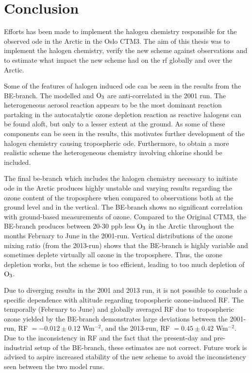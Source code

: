 \setcounter{chapter}{7}
\chapter{Conclusion}\label{Chap:conclusion}

Efforts has been made to implement the halogen chemistry responsible for the observed \acrfull{ode} in the Arctic in the Oslo CTM3. The aim of this thesis was to implement the halogen chemistry, verify the new scheme against observations and to estimate what impact the new scheme had on the \acrfull{rf} globally and over the Arctic.

\medskip

Some of the features of halogen induced \acrshort{ode} can be seen in the results from the BE-branch. The modelled  and $\mathrm{O_3}$ are anti-correlated in the 2001 run. The heterogeneous aerosol reaction appears to be the most dominant reaction partaking in the autocatalytic ozone depletion reaction as reactive halogens can be found aloft, but only to a lesser extent at the ground. As some of these components can be seen in the results, this motivates further development of the halogen chemistry causing tropospheric \acrshort{ode}. Furthermore, to obtain a more realistic scheme the heterogeneous chemistry involving chlorine should be included. 

\medskip

The final \acrfull{be}-branch which includes the halogen chemistry necessary to initiate \acrshort{ode} in the Arctic produces highly unstable and varying results regarding the ozone content of the troposphere when compared to observations both at the ground level and in the vertical. The BE-branch shows no significant correlation with ground-based measurements of ozone. Compared to the Original CTM3, the BE-branch produces between 20-30 ppb less $\mathrm{O_3}$ in the Arctic throughout the months February to June in the 2001-run. Vertical distributions of the ozone mixing ratio (from the 2013-run) shows that the BE-branch is highly variable and sometimes deplete virtually all ozone in the troposphere. Thus, the ozone depletion works, but the scheme is too efficient, leading to too much depletion of $\mathrm{O_3}$.  


\medskip

Due to diverging results in the 2001 and 2013 run, it is not possible to conclude a specific dependence with altitude regarding tropospheric ozone-induced RF. The temporally (February to June) and globally averaged RF due to tropospheric ozone yielded by the BE-branch demonstrates large deviations between the 2001-run, RF $=-0.012\pm0.12$ Wm$^{-2}$, and the 2013-run, RF $= 0.45\pm0.42$ Wm$^{-2}$. Due to the inconsistency in RF and the fact that the present-day and pre-industrial setup of the BE-branch, these estimates are not correct. Future work is advised to aspire increased stability of the new scheme to avoid the inconsistency seen between the two model runs.  